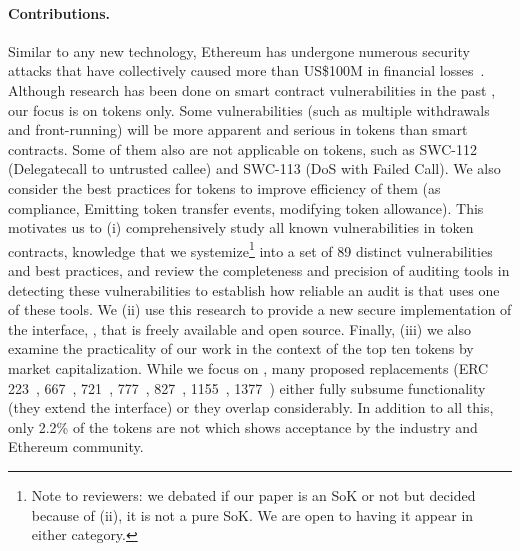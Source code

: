\paragraph{Contributions.} Similar to any new technology, Ethereum has undergone numerous security attacks that have collectively caused more than US\$100M in financial losses~\cite{DAO1,PeckShield,PartiyMultiSig,MyEthWallet,ParityFirstHack,ParitySecondHack}. {\chg Although research has been done on smart contract vulnerabilities in the past \cite{EthSecServ}, our focus is on \erc tokens only. Some vulnerabilities (such as multiple withdrawals and front-running) will be more apparent and serious in tokens than smart contracts. Some of them also are not applicable on \erc tokens, such as SWC-112 (Delegatecall to untrusted callee) and SWC-113 (DoS with Failed Call). We also consider the best practices for tokens to improve efficiency of them (\eg as \erc compliance, Emitting token transfer events, modifying token allowance).} This motivates us to (i) comprehensively study all known vulnerabilities in \erc token contracts, knowledge that we systemize\footnote{Note to reviewers: we debated if our paper is an SoK or not but decided because of (ii), it is not a pure SoK. We are open to having it appear in either category.} into a set of 89 distinct vulnerabilities {\chg and best practices}, and review the completeness and precision of auditing tools in detecting these vulnerabilities to establish how reliable an audit is that uses one of these tools. We (ii) use this research to provide a new secure implementation of the \erc interface, \sys, that is freely available and open source. Finally, (iii) we also examine the practicality of our work in the context of the top ten \erc tokens {\chg by market capitalization}. While we focus on \erc, many \erc proposed replacements (\ie ERC 223~\cite{Ref20}, 667~\cite{Ref21}, 721~\cite{Ref22}, 777~\cite{Ref23}, 827~\cite{Ref24}, 1155~\cite{Ref25}, 1377~\cite{Ref26}) either fully subsume \erc functionality (\ie they extend the \erc interface) or they overlap considerably. {\chg In addition to all this, only 2.2\% of the tokens are not \erc\cite{EtherScan} which shows \erc acceptance by the industry and Ethereum community.}